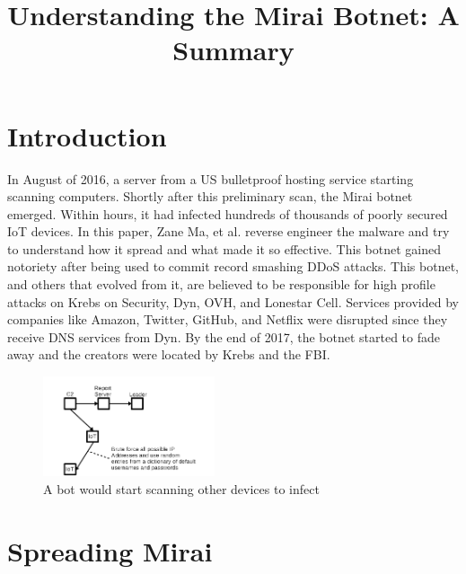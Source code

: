 \documentclass[conference]{IEEEtran}
\begin{document}
\title{Understanding the Mirai Botnet: A Summary}

\author{
}

\maketitle

\section{Introduction}

In August of 2016, a server from a US bulletproof hosting service starting scanning computers. Shortly after this preliminary scan, the Mirai botnet emerged. Within hours, it had infected hundreds of thousands of poorly secured IoT devices. In this paper, Zane Ma, et al. reverse engineer the malware and try to understand how it spread and what made it so effective. This botnet gained notoriety after being used to commit record smashing DDoS attacks. This botnet, and others that evolved from it, are believed to be responsible for high profile attacks on Krebs on Security, Dyn, OVH, and Lonestar Cell. Services provided by companies like Amazon, Twitter, GitHub, and Netflix were disrupted since they receive DNS services from Dyn. By the end of 2017, the botnet started to fade away and the creators were located by Krebs and the FBI.

\begin{figure}[b]
\centerline{\includegraphics[width=0.45\textwidth]{../fig1.png}}
\caption{A bot would start scanning other devices to infect}
\label{scan}
\end{figure}

\section{Spreading Mirai}
\end{document}

